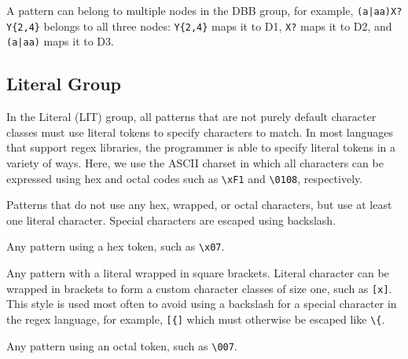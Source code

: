 \begin{description}
\end{description}

A pattern can belong to multiple nodes in the DBB group, for example, \verb!(a|aa)X?Y{2,4}! belongs to all three nodes: \verb!Y{2,4}! maps it to D1, \verb!X?!  maps it to D2, and \verb!(a|aa)!  maps it to D3.




\subsection{Literal Group}
In the Literal (LIT) group, all patterns that are not purely default character classes must use  literal tokens to specify  characters to match.  In  most  languages that support regex libraries, the programmer is able to specify literal tokens in a variety of ways.  Here, we use the ASCII charset in which all characters can be expressed using hex and octal codes such as \verb!\xF1! and \verb!\0108!, respectively.  



\begin{description}  \itemsep -1pt
\item[T1:] Patterns that do not use any hex, wrapped, or octal characters, but use at least one literal character. Special characters are escaped using backslash. 
\item[T2:] Any pattern using a hex token, such as \verb!\x07!.
\item[T3:]  Any pattern with a literal wrapped in square brackets. 
Literal character can be wrapped in brackets to form a custom character classes of size one, such as \verb![x]!. This style is used most often to avoid using a backslash for a special character in the regex language, for example, \verb![{]! which must otherwise be escaped like \verb!\{!.

\item[T4:] Any pattern using an octal token, such as \verb!\007!.
\end{description}


